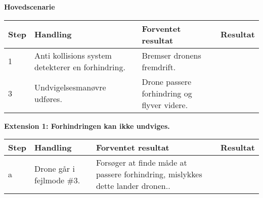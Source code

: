 \textbf{Hovedscenarie}
\begin{table}[H]
	\centering
		\begin{tabular}{|l|p{5 cm}|p{5 cm}|p{3.5 cm}|} 
		\hline
			Step & Handling & Forventet resultat & Resultat\\ \hline
			1 & Anti kollisions system detekterer en forhindring. & Bremser dronens fremdrift. &  \\ \hline
			3 & Undvigelsesmanøvre udføres. & Drone passere forhindring og flyver videre. & \\ \hline			
		\end{tabular}
\end{table}

\textbf{Extension 1: Forhindringen kan ikke undviges.}
\begin{table}[H]
	\centering
		\begin{tabular}{|l|p{5 cm}|p{5 cm}|p{3.5 cm}|} 
		\hline
			Step & Handling & Forventet resultat & Resultat\\ \hline
			a & Drone går i fejlmode \#3. & Forsøger at finde måde at passere forhindring, mislykkes dette lander dronen.. & \\ \hline
		\end{tabular}
\end{table}


